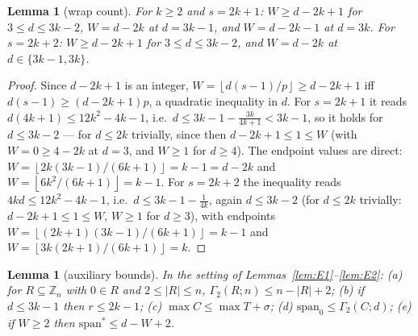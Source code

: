 \documentclass[11pt,a4paper]{article}
\numberwithin{equation}{section}
\theoremstyle{plain}
\newtheorem{lemma}[theorem]{Lemma}
\theoremstyle{definition}
\theoremstyle{remark}
\newcommand{\Z}{\mathbb{Z}}
\newcommand{\floor}[1]{\left\lfloor #1 \right\rfloor}
\begin{document}
\begin{lemma}[wrap count]\label{lem:E3}
For $k\ge2$ and $s=2k{+}1$: $W\ge d-2k+1$ for $3\le d\le3k-2$, $W=d-2k$
at $d=3k-1$, and $W=d-2k-1$ at $d=3k$. For $s=2k{+}2$: $W\ge d-2k+1$
for $3\le d\le3k-2$, and $W=d-2k$ at $d\in\{3k-1,3k\}$.
\end{lemma}

\begin{proof}
Since $d-2k+1$ is an integer, $W=\floor{d(s-1)/p}\ge d-2k+1$ iff
$d(s-1)\ge(d-2k+1)p$, a quadratic inequality in $d$. For $s=2k+1$ it
reads $d(4k+1)\le12k^2-4k-1$, i.e.\
$d\le3k-1-\frac{3k}{4k+1}<3k-1$, so it holds for $d\le3k-2$ --- for
$d\le2k$ trivially, since then $d-2k+1\le1\le W$ (with $W=0\ge4-2k$ at
$d=3$, and $W\ge1$ for $d\ge4$). The endpoint values are direct:
$W=\floor{2k(3k-1)/(6k+1)}=k-1=d-2k$ and $W=\floor{6k^2/(6k+1)}=k-1$.
For $s=2k+2$ the inequality reads $4kd\le12k^2-4k-1$, i.e.\
$d\le3k-1-\frac1{4k}$, again $d\le3k-2$ (for $d\le2k$ trivially:
$d-2k+1\le1\le W$, $W\ge1$ for $d\ge3$), with endpoints
$W=\floor{(2k+1)(3k-1)/(6k+1)}=k-1$ and
$W=\floor{3k(2k+1)/(6k+1)}=k$.
\end{proof}

\begin{lemma}[auxiliary bounds]\label{lem:E4}
In the setting of Lemmas~\ref{lem:E1}--\ref{lem:E2}:
\textup{(a)} for $R\subseteq\Z_n$ with $0\in R$ and $2\le|R|\le n$,
$\Gamma_2(R;n)\le n-|R|+2$;
\textup{(b)} if $d\le3k-1$ then $r\le2k-1$;
\textup{(c)} $\max C\le\max T+\sigma$;
\textup{(d)} $\mathrm{span}_0\le\Gamma_2(C;d)$;
\textup{(e)} if $W\ge2$ then $\mathrm{span}^\ast\le d-W+2$.
\end{lemma}
\end{document}
